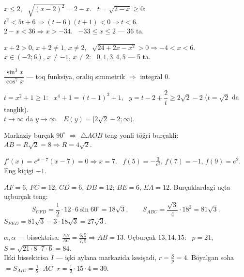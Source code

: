 $x\le2$, \ $\sqrt{(x-2)^2}=2-x$. \ $t=\sqrt{2-x}\ge0$: \ $t^2<5t+6\Rightarrow(t-6)(t+1)<0\Rightarrow t<6$.\\
$2-x<36\Rightarrow x>-34$. \ $-33\le x\le2$ — 36 ta.

$x+2>0$, $x+2\ne1$, $x\ne2$, \ $\sqrt{24+2x-x^2}>0\Rightarrow-4<x<6$.\\
$x\in(-2;6)$, $x\ne-1$, $x\ne2$: \ $0,1,3,4,5$ — 5 ta.

$\dfrac{\sin^3x}{\cos^7x}$ — toq funksiya, oraliq simmetrik $\Rightarrow$ integral 0.

$t=x^2+1\ge1$: \ $x^4+1=(t-1)^2+1$, \ $y=t-2+\dfrac2t\ge2\sqrt2-2$ ($t=\sqrt2$ da tenglik).\\
$t\to\infty$ da $y\to\infty$. \ $E(y)=[2\sqrt2-2;\infty)$.
\Javob{C) $[2\sqrt2-2;\infty)$}

Markaziy burçak $90^\circ$ $\Rightarrow$ $\triangle AOB$ teng yonli töğri burçakli: $AB=R\sqrt2=8\Rightarrow R=4\sqrt2$.

$f'(x)=e^{x-7}(x-7)=0\Rightarrow x=7$. \ $f(5)=-\frac3{e^2}$, $f(7)=-1$, $f(9)=e^2$. Eng kiçigi $-1$.

$AF=6$, $FC=12$; $CD=6$, $DB=12$; $BE=6$, $EA=12$. Burçaklardagi uçta uçburçak teng:
\[S_{CFD}=\frac12\cdot12\cdot6\sin60^\circ=18\sqrt3,\qquad S_{ABC}=\frac{\sqrt3}4\cdot18^2=81\sqrt3.\]
$S_{FED}=81\sqrt3-3\cdot18\sqrt3=27\sqrt3$.

$\alpha,\alpha$ — bissektrisa: $\frac{AB}{AC}=\frac{6{,}5}{7{,}5}\Rightarrow AB=13$. Uçburçak $13,14,15$: \ $p=21$, $S=\sqrt{21\cdot8\cdot7\cdot6}=84$.\\
Ikki bissektrisa $I$ — içki aylana markazida kesişadi, $r=\frac Sp=4$.
Böyalgan soha $=S_{AIC}=\frac12\cdot AC\cdot r=\frac12\cdot15\cdot4=30$.

